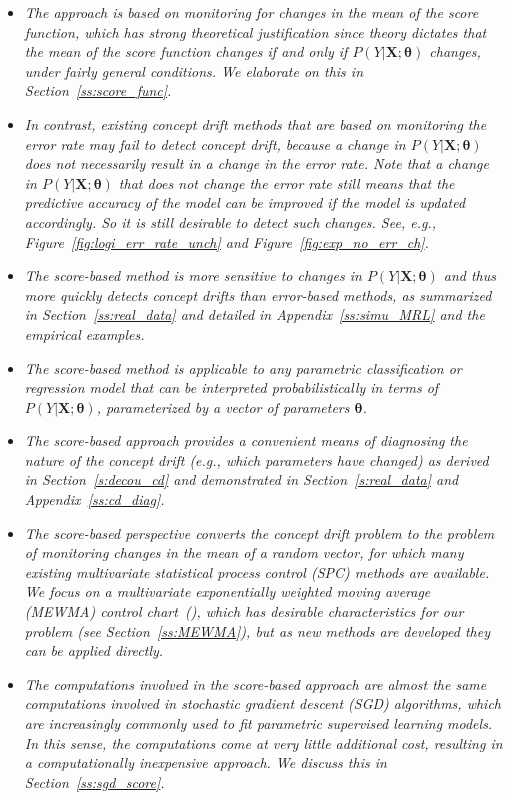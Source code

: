 \documentclass[twoside,11pt]{article}
\begin{document}
\begin{itemize}
\item
\textit{The approach is based on monitoring for changes in the mean of the score function, which has strong theoretical justification since theory dictates that the mean of the score function changes if and only if $P(Y|\bm{X};\bm{\theta})$ changes, under fairly general conditions. We elaborate on this in Section~\ref{ss:score_func}.}
\item
\textit{In contrast, existing concept drift methods that are based on monitoring the error rate may fail to detect concept drift, because a change in $P(Y|\bm{X};\bm{\theta})$ does not necessarily result in a change in the error rate. Note that a change in $P(Y|\bm{X};\bm{\theta})$ that does not change the error rate still means that the predictive accuracy of the model can be improved if the model is updated accordingly. So it is still desirable to detect such changes. See, e.g., Figure~\ref{fig:logi_err_rate_unch} and Figure~\ref{fig:exp_no_err_ch}.}
\item
\textit{The score-based method is more sensitive to changes in $P(Y|\bm{X}; \bm{\theta})$ and thus more quickly detects concept drifts than error-based methods, as summarized in Section~\ref{ss:real_data} and detailed in Appendix~\ref{ss:simu_MRL} and the empirical examples.}
\item
\textit{The score-based method is applicable to any parametric classification or regression model that can be interpreted probabilistically in terms of $P(Y|\bm{X};\bm{\theta})$, parameterized by a vector of parameters $\bm{\theta}$.}
\item
\textit{The score-based approach provides a convenient means of diagnosing the nature of the concept drift (e.g., which parameters have changed) as derived in Section~\ref{s:decou_cd} and demonstrated in Section~\ref{s:real_data} and Appendix~\ref{ss:cd_diag}.}
\item
\textit{The score-based perspective converts the concept drift problem to the problem of monitoring changes in the mean of a random vector, for which many existing multivariate statistical process control (SPC) methods are available. We focus on a multivariate exponentially weighted moving average (MEWMA) control chart~(\cite{montgomery2007introduction}), which has desirable characteristics for our problem (see Section~\ref{ss:MEWMA}), but as new methods are developed they can be applied directly.}
\item
\textit{The computations involved in the score-based approach are almost the same computations involved in stochastic gradient descent (SGD) algorithms, which are increasingly commonly used to fit parametric supervised learning models. In this sense, the computations come at very little additional cost, resulting in a computationally inexpensive approach. We discuss this in Section~\ref{ss:sgd_score}.}

\end{itemize}
\end{document}
